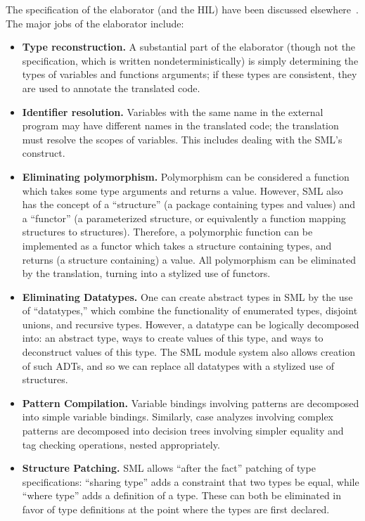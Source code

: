 \documentclass[12pt,twoside]{article}
\begin{document}
The specification of the elaborator (and the HIL) have been
discussed elsewhere~\cite{HS:milnervolume, HS:techreport}.
The major jobs of the elaborator include:

\begin{itemize}
\item \textbf{Type reconstruction. } A substantial part
of the elaborator (though not the specification, which is written
nondeterministically) is simply determining the types of variables and
functions arguments; if these types are consistent, they are used to
annotate the translated code.

\item \textbf{Identifier resolution. }  Variables with the
same name in the external program may have different names in
the translated code; the translation must resolve the scopes
of variables.  This includes dealing with the SML's
 construct.

\item \textbf{Eliminating polymorphism. }  Polymorphism
can be considered a function which takes some type arguments and
returns a value.  However, SML also has the concept of a ``structure''
(a package containing types and values) and a ``functor'' (a
parameterized structure, or equivalently a function mapping structures
to structures).  Therefore, a polymorphic function can be implemented
as a functor which takes a structure containing types, and returns (a
structure containing) a value.  All polymorphism can be
eliminated by the translation, turning into a stylized use of
functors.

\item \textbf{Eliminating Datatypes. }  One can create abstract
types in SML by the use of ``datatypes,'' which combine the
functionality of enumerated types, disjoint unions, and recursive
types.  However, a datatype can be logically decomposed into: an
abstract type, ways to create values of this type, and ways to
deconstruct values of this type.  The SML module
system also allows creation of such ADTs, and so we can replace all
datatypes with a stylized use of structures.

\item \textbf{Pattern Compilation. } Variable bindings involving patterns
are decomposed into simple variable
bindings.  Similarly, case analyzes involving complex patterns are
decomposed into decision trees involving simpler equality and tag
checking operations, nested appropriately.

\item \textbf{Structure Patching. } SML allows ``after the fact'' patching
of type specifications: ``sharing type'' adds a constraint that two types be
equal, while ``where type'' adds a definition of a type.  These
can both be eliminated in favor of type definitions at the point
where the types are first declared.


\end{itemize}
\end{document}
